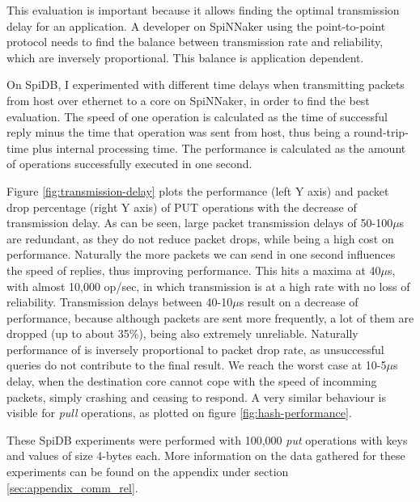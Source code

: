 This evaluation is important because it allows finding the optimal transmission delay for an application. A developer on SpiNNaker using the point-to-point protocol needs to find the balance between transmission rate and reliability, which are inversely proportional. This balance is application dependent.

On SpiDB, I experimented with different time delays when transmitting packets from host over ethernet to a core on SpiNNaker, in order to find the best evaluation. The speed of one operation is calculated as the time of successful reply minus the time that operation was sent from host, thus being a round-trip-time plus internal processing time. The performance is calculated as the amount of operations successfully executed in one second.

Figure \ref{fig:transmission-delay} plots the performance (left Y axis) and packet drop percentage (right Y axis) of PUT operations  with the decrease of transmission delay. As can be seen, large packet transmission delays of 50-100$\mu$s are redundant, as they do not reduce packet drops, while being a high cost on performance. Naturally the more packets we can send in one second influences the speed of replies, thus improving performance. This hits a maxima at 40$\mu$s, with almost 10,000 op/sec, in which transmission is at a high rate with no loss of reliability. Transmission delays between 40-10$\mu$s result on a decrease of performance, because although packets are sent more frequently, a lot of them are dropped (up to about 35\%), being also extremely unreliable. Naturally performance of is inversely proportional to packet drop rate, as unsuccessful queries do not contribute to the final result. We reach the worst case at 10-5$\mu$s delay, when the destination core cannot cope with the speed of incomming packets, simply crashing and ceasing to respond. A very similar behaviour is visible for \textit{pull} operations, as plotted on figure \ref{fig:hash-performance}.

These SpiDB experiments were performed with 100,000 \textit{put} operations with keys and values of size 4-bytes each. More information on the data gathered for these experiments can be found on the appendix under section \ref{sec:appendix_comm_rel}.

